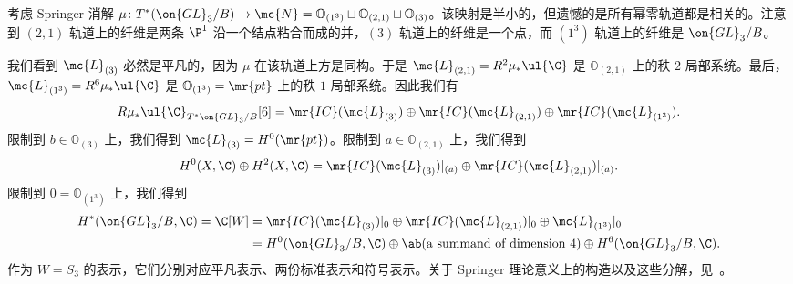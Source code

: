 \begin{exm}
    考虑 Springer 消解 \(\mu \colon T^*(\on{GL}_3/B) \to \mc{N} = \mathbb{O}_{(1^3)} \sqcup \mathbb{O}_{(2,1)} \sqcup \mathbb{O}_{(3)}\)。该映射是半小的，但遗憾的是所有幂零轨道都是相关的。注意到 \((2,1)\) 轨道上的纤维是两条 \(\P^1\) 沿一个结点粘合而成的并，\((3)\) 轨道上的纤维是一个点，而 \((1^3)\) 轨道上的纤维是 \(\on{GL}_3/B\)。

    我们看到 \(\mc{L}_{(3)}\) 必然是平凡的，因为 \(\mu\) 在该轨道上方是同构。于是 \(\mc{L}_{(2,1)} = R^2 \mu_* \ul{\C}\) 是 \(\mathbb{O}_{(2,1)}\) 上的秩 \(2\) 局部系统。最后，\(\mc{L}_{(1^3)} = R^6 \mu_* \ul{\C}\) 是 \(\mathbb{O}_{(1^3)} = \mr{pt}\) 上的秩 \(1\) 局部系统。因此我们有
    \[ R \mu_* \ul{\C}_{T^*\on{GL}_3/B}[6] = \mr{IC}(\mc{L}_{(3)}) \oplus \mr{IC}(\mc{L}_{(2,1)}) \oplus \mr{IC}(\mc{L}_{(1^3)}). \]
    限制到 \(b \in \mathbb{O}_{(3)}\) 上，我们得到 \(\mc{L}_{(3)} = H^0(\mr{pt})\)。限制到 \(a \in \mathbb{O}_{(2,1)}\) 上，我们得到
    \[ H^0(X, \C) \oplus H^2(X, \C) = \mr{IC}(\mc{L}_{(3)})|_{(a)} \oplus \mr{IC}(\mc{L}_{(2,1)})|_{(a)}. \]
    限制到 \(0 = \mathbb{O}_{(1^3)}\) 上，我们得到
    \begin{align*}
        H^*(\on{GL}_3/B, \C) = \C[W] &= \mr{IC}(\mc{L}_{(3)})|_0 \oplus \mr{IC}(\mc{L}_{(2,1)})|_0 \oplus \mc{L}_{(1^3)}|_0 \\
        &= H^0(\on{GL}_3/B, \C) \oplus \ab(\text{a summand of dimension } 4) \oplus H^6(\on{GL}_3/B, \C).
    \end{align*}
    作为 \(W = S_3\) 的表示，它们分别对应平凡表示、两份标准表示和符号表示。关于 Springer 理论意义上的构造以及这些分解，见~\cite{BorhoMacPherson1983}。
\end{exm}

